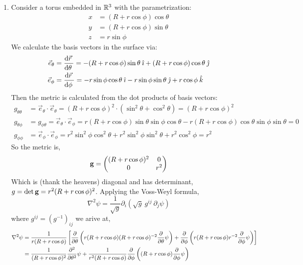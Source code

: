 \documentclass[12pt]{extarticle}
\begin{document}
\begin{enumerate}
\item Consider a torus embedded in $\R^3$ with the parametrization:
\begin{align*}
x &= (R + r \cos{\phi}) \cos{\theta} \\
y &= (R + r \cos{\phi}) \sin{\theta} \\
z &= r \sin{\phi} 
\end{align*}
We calculate the basis vectors in the surface via:
\begin{align*}
\vec{e}_\theta &= \deriv{\vec{r}}{\theta} = -(R + r \cos{\phi}) \sin{\theta} \: \hat \imath + (R + r \cos{\phi}) \cos{\theta} \: \hat \jmath \\
\vec{e}_\phi &= \deriv{\vec{r}}{\phi} = - r \sin{\phi} \cos{\theta} \: \hat \imath - r \sin{\phi} \sin{\theta} \: \hat \jmath + r \cos{\phi} \: \hat k \\
\end{align*}
Then the metric is calculated from the dot products of basis vectors:
\begin{align*}
g_{\theta \theta} &= \vec{e}_\theta \cdot \vec{e}_\theta = (R + r \cos{\phi})^2 \cdot (\sin^2{\theta} + \cos^2{\theta}) = (R + r \cos{\phi})^2 \\
g_{\theta \phi} &= g_{\phi \theta} = \vec{e}_\theta \cdot \vec{e}_\phi = r(R + r \cos{\phi}) \sin{\theta} \sin{\phi} \cos{\theta} - r(R + r \cos{\phi}) \cos{\theta} \sin{\phi} \sin{\theta} = 0 \\
g_{\phi \phi} &= \vec{e}_\phi \cdot \vec{e}_\phi = r^2 \sin^2{\phi} \cos^2{\theta} + r^2 \sin^2{\phi} \sin^2{\theta} + r^2 \cos^2{\phi} = r^2
\end{align*}
So the metric is, 
\[\bf{g} = 
\begin{pmatrix}
(R + r \cos{\phi})^2 & 0 \\
0 & r^2
\end{pmatrix}
\]
Which is (thank the heavens) diagonal and has determinant, $g = \det{\bf{g}} = r^2(R + r \cos{\phi})^2$. Applying the Voss-Weyl formula, \[ \nabla^2 \psi = \frac{1}{\sqrt{g}} \partial_i \left( \sqrt{g} \: g^{ij} \: \partial_j \psi \right)\] where $g^{ij} = (g^{-1})_{ij}$ we arive at, 
\begin{align*} \nabla^2 \psi &= \frac{1}{r(R + r \cos{\phi})} \left[ \pderiv{}{\theta} \left( r(R + r \cos{\phi}) (R + r \cos{\phi})^{-2} \pderiv{}{\theta} \psi \right) + \pderiv{}{\phi} \left( r(R + r \cos{\phi}) r^{-2} \pderiv{}{\phi} \psi \right) \right] \\ & =
\frac{1}{(R + r \cos{\phi})^2} \parsq{}{\theta} \psi + \frac{1}{r^2 (R + r \cos{\phi})} \pderiv{}{\phi} \left( (R + r \cos{\phi}) \pderiv{}{\phi} \psi \right)

\end{align*}
\end{enumerate}
\end{document}
